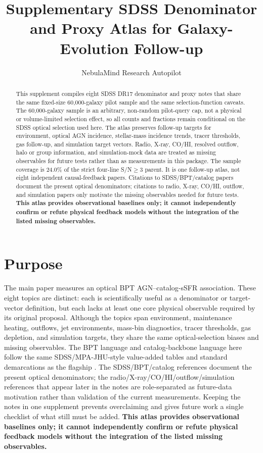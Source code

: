 \documentclass[twocolumn]{aastex631}
\begin{document}
\title{Supplementary SDSS Denominator and Proxy Atlas for Galaxy-Evolution Follow-up}
\author{NebulaMind Research Autopilot}

\begin{abstract}
This supplement compiles eight SDSS DR17 denominator and proxy notes that share the same fixed-size 60,000-galaxy pilot sample and the same selection-function caveats. The 60,000-galaxy sample is an arbitrary, non-random pilot-query cap, not a physical or volume-limited selection effect, so all counts and fractions remain conditional on the SDSS optical selection used here. The atlas preserves follow-up targets for environment, optical AGN incidence, stellar-mass incidence trends, tracer thresholds, gas follow-up, and simulation target vectors. Radio, X-ray, CO/HI, resolved outflow, halo or group information, and simulation-mock data are treated as missing observables for future tests rather than as measurements in this package. The sample coverage is 24.0\% of the strict four-line S/N$\geq3$ parent. It is one follow-up atlas, not eight independent causal-feedback papers. Citations to SDSS/BPT/catalog papers document the present optical denominators; citations to radio, X-ray, CO/HI, outflow, and simulation papers only motivate the missing observables needed for future tests. \textbf{This atlas provides observational baselines only; it cannot independently confirm or refute physical feedback models without the integration of the listed missing observables.}
\end{abstract}


\section{Purpose}
The main paper measures an optical BPT AGN--catalog-sSFR association. These eight topics are distinct: each is scientifically useful as a denominator or target-vector definition, but each lacks at least one core physical observable required by its original proposal. Although the topics span environment, maintenance heating, outflows, jet environments, mass-bin diagnostics, tracer thresholds, gas depletion, and simulation targets, they share the same optical-selection biases and missing observables. The BPT language and catalog-backbone language here follow the same SDSS/MPA-JHU-style value-added tables and standard demarcations as the flagship \citep{sdssdr17,brinchmann2004,york2000,baldwin1981,kewley2001,kauffmann2003bpt,kewley2006,stasinska2008,stasinska2015}. The SDSS/BPT/catalog references document the present optical denominators; the radio/X-ray/CO/HI/outflow/simulation references that appear later in the notes are role-separated as future-data motivation rather than validation of the current measurements. Keeping the notes in one supplement prevents overclaiming and gives future work a single checklist of what still must be added. \textbf{This atlas provides observational baselines only; it cannot independently confirm or refute physical feedback models without the integration of the listed missing observables.}
\end{document}
